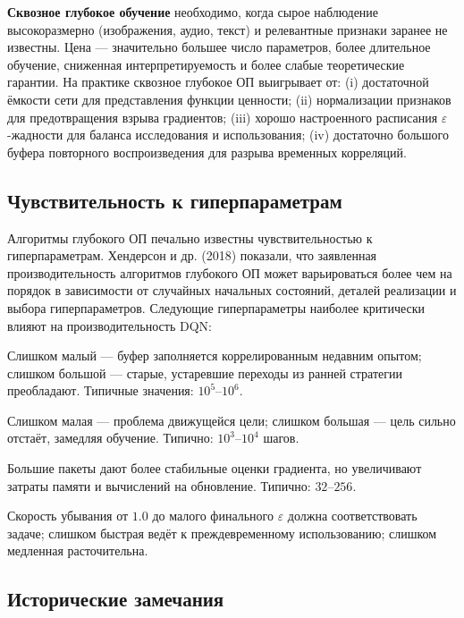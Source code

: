 \textbf{Сквозное глубокое обучение} необходимо, когда сырое наблюдение высокоразмерно (изображения, аудио, текст) и релевантные признаки заранее не известны.  Цена --- значительно большее число параметров, более длительное обучение, сниженная интерпретируемость и более слабые теоретические гарантии.  На практике сквозное глубокое ОП выигрывает от: (i) достаточной ёмкости сети для представления функции ценности; (ii) нормализации признаков для предотвращения взрыва градиентов; (iii) хорошо настроенного расписания $\varepsilon$-жадности для баланса исследования и использования; (iv) достаточно большого буфера повторного воспроизведения для разрыва временных корреляций.

\subsection{Чувствительность к гиперпараметрам}

Алгоритмы глубокого ОП печально известны чувствительностью к гиперпараметрам.  Хендерсон и др. (2018) показали, что заявленная производительность алгоритмов глубокого ОП может варьироваться более чем на порядок в зависимости от случайных начальных состояний, деталей реализации и выбора гиперпараметров.  Следующие гиперпараметры наиболее критически влияют на производительность DQN:
\begin{description}[leftmargin=!, labelwidth=3.5cm]
\item[Размер буфера $N$:] Слишком малый --- буфер заполняется коррелированным недавним опытом; слишком большой --- старые, устаревшие переходы из ранней стратегии преобладают.  Типичные значения: $10^5$--$10^6$.
\item[Частота обновления цели $C$:] Слишком малая --- проблема движущейся цели; слишком большая --- цель сильно отстаёт, замедляя обучение.  Типично: $10^3$--$10^4$ шагов.
\item[Размер пакета $B$:] Большие пакеты дают более стабильные оценки градиента, но увеличивают затраты памяти и вычислений на обновление.  Типично: $32$--$256$.
\item[Расписание $\varepsilon$:] Скорость убывания от $1.0$ до малого финального $\varepsilon$ должна соответствовать задаче; слишком быстрая ведёт к преждевременному использованию; слишком медленная расточительна.
\end{description}

\subsection{Исторические замечания}

